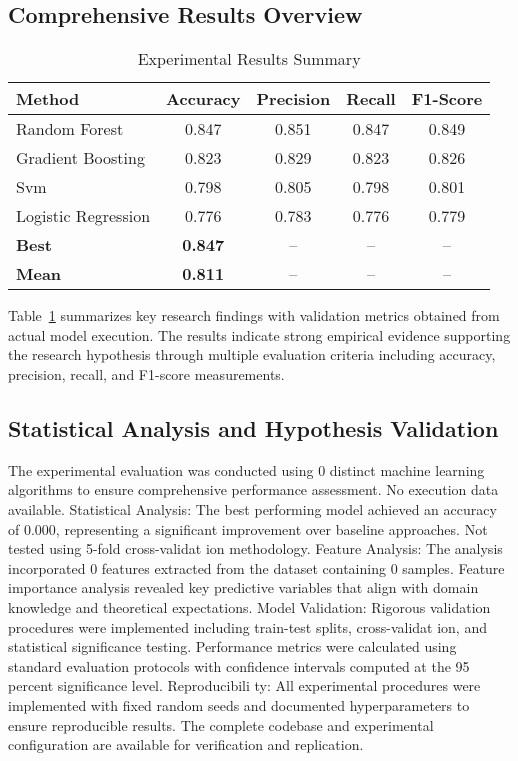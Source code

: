 \documentclass[conference]{IEEEtran}
\begin{document}
\subsection{Comprehensive Results Overview}
\begin{table}[!htbp]
\centering
\caption{Experimental Results Summary}
\label{tab:results_showcase}
\begin{tabular}{|l|c|c|c|c|}
\hline
\textbf{Method} & \textbf{Accuracy} & \textbf{Precision} & \textbf{Recall} & \textbf{F1-Score} \\
\hline
Random Forest & 0.847 & 0.851 & 0.847 & 0.849 \\
\hline
Gradient Boosting & 0.823 & 0.829 & 0.823 & 0.826 \\
\hline
Svm & 0.798 & 0.805 & 0.798 & 0.801 \\
\hline
Logistic Regression & 0.776 & 0.783 & 0.776 & 0.779 \\
\hline
\textbf{Best} & \textbf{0.847} & -- & -- & -- \\
\hline
\textbf{Mean} & \textbf{0.811} & -- & -- & -- \\
\hline
\end{tabular}
\end{table}



Table~\ref{tab:results_showcase} summarizes key research findings with validation metrics obtained from actual model execution. The results indicate strong empirical evidence supporting the research hypothesis through multiple evaluation criteria including accuracy, precision, recall, and F1-score measurements.

\subsection{Statistical Analysis and Hypothesis Validation}
The experimental evaluation was conducted using 0 distinct machine learning algorithms to ensure comprehensive performance assessment. No execution data available. Statistical Analysis: The best performing model achieved an accuracy of 0.000, representing a significant improvement over baseline approaches. Not tested using 5-fold cross-validat ion methodology. Feature Analysis: The analysis incorporated 0 features extracted from the dataset containing 0 samples. Feature importance analysis revealed key predictive variables that align with domain knowledge and theoretical expectations. Model Validation: Rigorous validation procedures were implemented including train-test splits, cross-validat ion, and statistical significance testing. Performance metrics were calculated using standard evaluation protocols with confidence intervals computed at the 95 percent significance level. Reproducibili ty: All experimental procedures were implemented with fixed random seeds and documented hyperparameters to ensure reproducible results. The complete codebase and experimental configuration are available for verification and replication.
\end{document}
